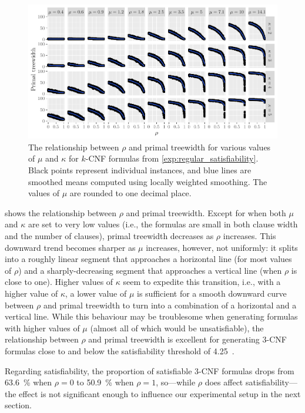 \documentclass[letterpaper]{article} %
\theoremstyle{definition}
\theoremstyle{remark}
\begin{document}
\begin{figure}
  \centering
  \includegraphics{regular_repetitiveness.pdf}
  \caption{The relationship between $\rho$ and primal treewidth for various
    values of $\mu$ and $\kappa$ for $k$-CNF formulas from
    \cref{exp:regular_satisfiability}. Black points represent individual
    instances, and blue lines are smoothed means computed using locally weighted
    smoothing. The values of $\mu$ are rounded to one decimal
    place.}\label{fig:regular_repetitiveness}
\end{figure}

 shows the relationship between $\rho$ and
primal treewidth. Except for when both $\mu$ and $\kappa$ are set to very low
values (i.e., the formulas are small in both clause width and the number of
clauses), primal treewidth decreases as $\rho$ increases. This downward trend
becomes sharper as $\mu$ increases, however, not uniformly: it splits into a
roughly linear segment that approaches a horizontal line (for most values of
$\rho$) and a sharply-decreasing segment that approaches a vertical line (when
$\rho$ is close to one). Higher values of $\kappa$ seem to expedite this
transition, i.e., with a higher value of $\kappa$, a lower value of $\mu$ is
sufficient for a smooth downward curve between $\rho$ and primal treewidth to
turn into a combination of a horizontal and a vertical line. While this
behaviour may be troublesome when generating formulas with higher values of
$\mu$ (almost all of which would be unsatisfiable), the relationship between
$\rho$ and primal treewidth is excellent for generating 3-CNF formulas close to
and below the satisfiability threshold of
4.25~\cite{DBLP:journals/ai/CrawfordA96}.

Regarding satisfiability, the proportion of satisfiable 3-CNF formulas drops
from \SI{63.6}{\percent} when $\rho = 0$ to \SI{50.9}{\percent} when $\rho = 1$,
so---while $\rho$ does affect satisfiability---the effect is not significant
enough to influence our experimental setup in the next section.
\end{document}
